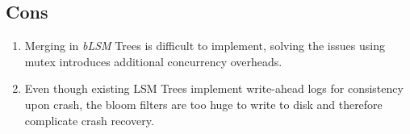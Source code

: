 \documentclass{article}
\theoremstyle{plain}
\begin{document}
\subsection{Cons}
\begin{enumerate}
  \item Merging in \emph{bLSM} Trees is difficult to implement, solving the issues
        using mutex introduces additional concurrency overheads.
    \item Even though existing LSM Trees implement write-ahead logs for
    consistency upon crash, the bloom filters are too huge to write to disk and
    therefore complicate crash recovery.
\end{enumerate}

\printbibliography
\end{document}
